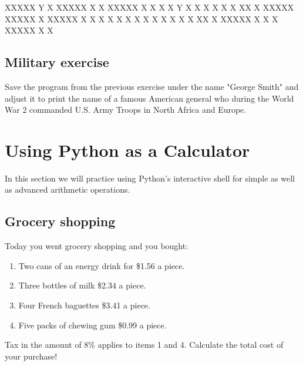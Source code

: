 \begin{bluecode}
XXXXX Y   X XXXXX X   X XXXXX X   X
X   X Y   X   X   X   X X   X XX  X
XXXXX XXXXX   X   XXXXX X   X X X X
X         X   X   X   X X   X X  XX
X     XXXXX   X   X   X XXXXX X   X
\end{bluecode}


\subsection{Military exercise}

Save the program from the previous exercise under the name 
"George Smith" and adjust it to print the name of a famous American
general who during the World War 2 commanded U.S. Army Troops
in North Africa and Europe. 


\section{Using Python as a Calculator}

In this section we will practice using Python's interactive shell for simple 
as well as advanced arithmetic operations.


\subsection{Grocery shopping}

Today you went grocery shopping and you bought:
\begin{enumerate}
\item Two cans of an energy drink for \$1.56 a piece.
\item Three bottles of milk \$2.34 a piece.
\item Four French baguettes \$3.41 a piece.
\item Five packs of chewing gum \$0.99 a piece.
\end{enumerate}
Tax in the amount of 8\% applies to items 1 and 4.
Calculate the total cost of your purchase!


